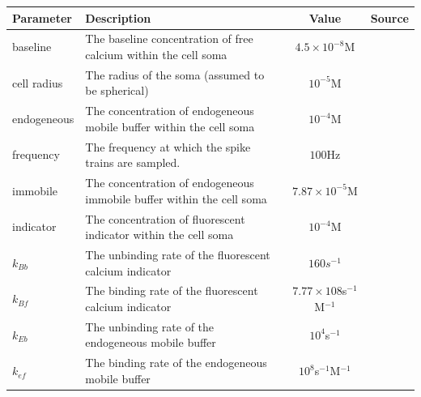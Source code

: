 \documentclass[a4paper,12pt]{article}
\theoremstyle{definition}
\begin{document}
\begin{table}
    \centering
    \begin{tabular}[t]{|l|p{6cm}|c|c|}
        \hline
        \textbf{Parameter}  & \textbf{Description}                                                                      & \textbf{Value}                        & \textbf{Source} \\ \hline
        baseline            & The baseline concentration of free calcium within the cell soma                           & $4.5 \times 10^{−8}$M                 & \cite{maravall} \\ \hline
        cell radius         & The radius of the soma (assumed to be spherical)                                          & $10^{-5}$M                            & \cite{fiala} \\ \hline
        endogeneous         & The concentration of endogeneous mobile buffer within the cell soma                       & $10^{-4}$M                            & \cite{faas} \\ \hline
        frequency           & The frequency at which the spike trains are sampled.                                      & $100$Hz                               & \\ \hline
        immobile            & The concentration of endogeneous immobile buffer within the cell soma                     & $7.87 \times 10^{-5}$M                & \cite{bartol} \\ \hline
        indicator           & The concentration of fluorescent indicator within the cell soma                           & $10^{-4}$M                            & \cite{maravall} \\ \hline
        $k_{Bb}$            & The unbinding rate of the fluorescent calcium indicator                                   & $160s^{−1}$                           & \cite{bartol} \\ \hline
        $k_{Bf}$            & The binding rate of the fluorescent calcium indicator                                     & $7.77 \times 108$s$^{−1}$M$^{−1}$     & \cite{bartol} \\ \hline
        $k_{Eb}$            & The unbinding rate of the endogeneous mobile buffer                                       & $10^4$s$^{-1}$                        & \cite{bartol} \\ \hline
        $k_{ef}$            & The binding rate of the endogeneous mobile buffer                                         & $10^8$s$^{-1}$M$^{-1}$                & \cite{bartol} \\ \hline

\end{tabular}
\end{table}
\end{document}

